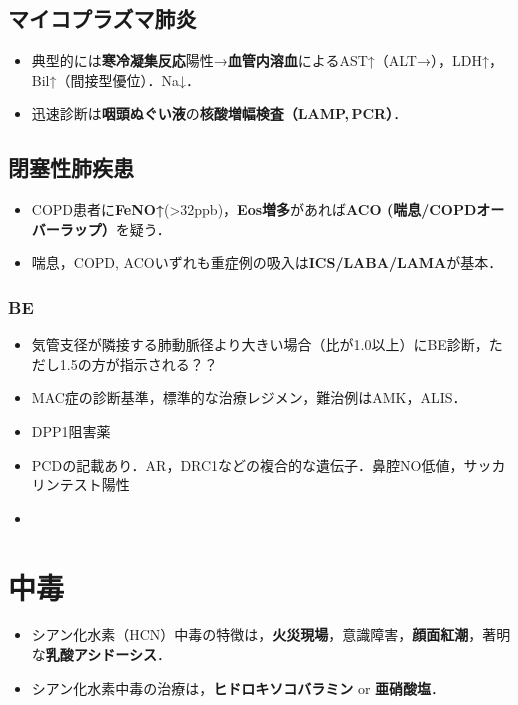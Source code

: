 \subsection{マイコプラズマ肺炎}
\begin{itemize}
\item 典型的には\textbf{寒冷凝集反応}陽性→\textbf{血管内溶血}によるAST↑（ALT→），LDH↑，Bil↑（間接型優位）．Na↓．
\item 迅速診断は\textbf{咽頭ぬぐい液}の\textbf{核酸増幅検査（LAMP,\,PCR）}．
\end{itemize}
\subsection{閉塞性肺疾患}
\begin{itemize}
\item COPD患者に\textbf{FeNO↑}(>32ppb)，\textbf{Eos増多}があれば\textbf{ACO (喘息/COPDオーバーラップ）}を疑う．
\item 喘息，COPD, ACOいずれも重症例の吸入は\textbf{ICS/LABA/LAMA}が基本．

\end{itemize}

\subsubsection{BE}
\begin{itemize}
\item 気管支径が隣接する肺動脈径より大きい場合（比が1.0以上）にBE診断，ただし1.5の方が指示される？？
\item MAC症の診断基準，標準的な治療レジメン，難治例はAMK，ALIS．
\item DPP1阻害薬
\item PCDの記載あり．AR，DRC1などの複合的な遺伝子．鼻腔NO低値，サッカリンテスト陽性
\item 
\end{itemize}


\section{中毒}
\begin{itemize}
\item シアン化水素（HCN）中毒の特徴は，\textbf{火災現場}，意識障害，\textbf{顔面紅潮}，著明な\textbf{乳酸アシドーシス}．
\item シアン化水素中毒の治療は，\textbf{ヒドロキソコバラミン} or \textbf{亜硝酸塩}．

\end{itemize}

